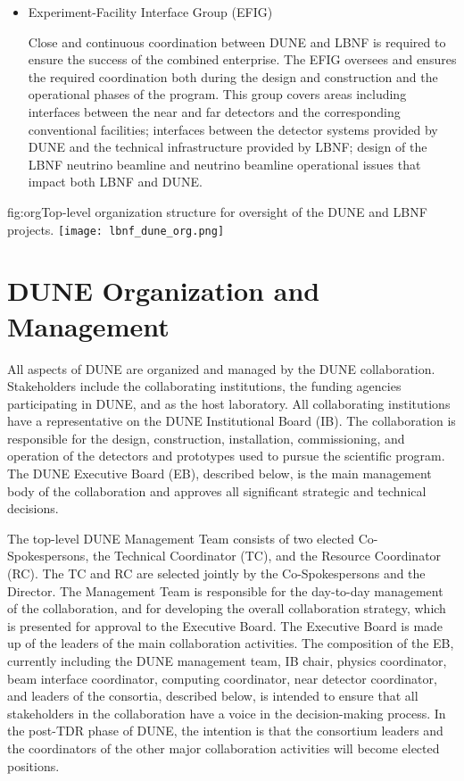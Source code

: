 \begin{itemize}
\item Experiment-Facility Interface Group (EFIG)

Close and continuous coordination between DUNE and LBNF is required to ensure the success of the combined enterprise. The EFIG  oversees and ensures the required coordination both during the design and construction and the operational phases of the program. This group covers areas including interfaces between the near and far detectors and the corresponding conventional facilities; interfaces between the detector systems provided by DUNE and the technical infrastructure provided by LBNF; design of the LBNF neutrino beamline and neutrino beamline operational issues that impact both LBNF and DUNE.  

\end{itemize}

\begin{dunefigure}	
{fig:org}{Top-level organization structure for oversight of the DUNE and LBNF projects.}
\texttt{[image: lbnf\_dune\_org.png]}
\end{dunefigure}

\section{DUNE Organization and Management}

All aspects of DUNE are organized and managed by the DUNE collaboration.  Stakeholders include the collaborating institutions, the funding agencies participating in DUNE, and \fnal as the host laboratory.  All collaborating institutions have a representative on the DUNE Institutional Board (IB). The collaboration is responsible for the design, construction, installation, commissioning, and operation of the detectors and prototypes used to pursue the scientific program. The DUNE Executive Board (EB), described below, is the main management body of the collaboration and approves all significant strategic and technical decisions.

The top-level DUNE Management Team consists of two elected Co-Spokespersons, the Technical Coordinator (TC), and the Resource Coordinator (RC). The TC and RC are selected jointly by the Co-Spokespersons and the \fnal Director. The Management Team is responsible for the day-to-day management of the collaboration, and for developing the overall collaboration strategy, which is presented for approval to the Executive Board. The Executive Board is made up of the leaders of the main collaboration activities. The composition of the EB, currently including the DUNE management team, IB chair, physics coordinator, beam interface coordinator, computing coordinator, near detector coordinator, and leaders of the  consortia, described below, is intended to ensure
that all stakeholders in the collaboration have a voice in the decision-making process. 
In the post-TDR phase of DUNE, the intention is that the consortium leaders and the coordinators of the other major collaboration activities will become elected positions.

